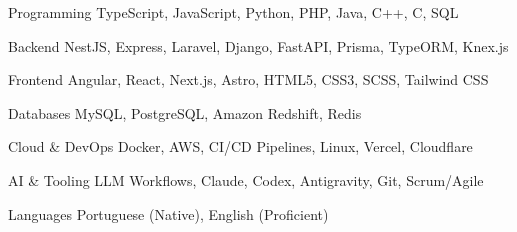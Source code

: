 

\begin{cvskills}

  \cvskill
    {Programming} %
    {TypeScript, JavaScript, Python, PHP, Java, C++, C, SQL} %

  \cvskill
    {Backend} %
    {NestJS, Express, Laravel, Django, FastAPI, Prisma, TypeORM, Knex.js} %

  \cvskill
    {Frontend} %
    {Angular, React, Next.js, Astro, HTML5, CSS3, SCSS, Tailwind CSS} %

  \cvskill
    {Databases} %
    {MySQL, PostgreSQL, Amazon Redshift, Redis} %

  \cvskill
    {Cloud \& DevOps} %
    {Docker, AWS, CI/CD Pipelines, Linux, Vercel, Cloudflare} %

  \cvskill
    {AI \& Tooling} %
    {LLM Workflows, Claude, Codex, Antigravity, Git, Scrum/Agile} %

  \cvskill
    {Languages} %
    {Portuguese (Native), English (Proficient)} %

\end{cvskills}
